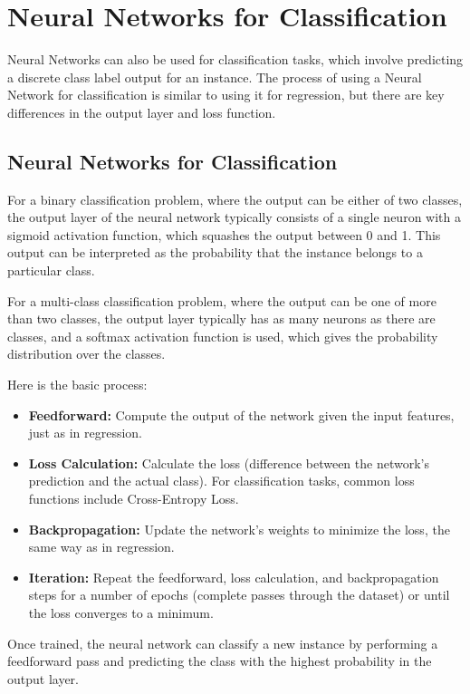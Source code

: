 \chapter{Neural Networks for Classification}

Neural Networks can also be used for classification tasks, which
involve predicting a discrete class label output for an instance. The
process of using a Neural Network for classification is similar to
using it for regression, but there are key differences in the output
layer and loss function.

\section{Neural Networks for Classification}

For a binary classification problem, where the output can be either of
two classes, the output layer of the neural network typically consists
of a single neuron with a sigmoid activation function, which squashes
the output between 0 and 1. This output can be interpreted as the
probability that the instance belongs to a particular class.

For a multi-class classification problem, where the output can be one
of more than two classes, the output layer typically has as many
neurons as there are classes, and a softmax activation function is
used, which gives the probability distribution over the classes.

Here is the basic process:

\begin{itemize}

\item \textbf{Feedforward:} Compute the output of the network given
  the input features, just as in regression.

\item \textbf{Loss Calculation:} Calculate the loss (difference
  between the network's prediction and the actual class). For
  classification tasks, common loss functions include Cross-Entropy
  Loss.

\item \textbf{Backpropagation:} Update the network's weights to
  minimize the loss, the same way as in regression.

\item \textbf{Iteration:} Repeat the feedforward, loss calculation,
  and backpropagation steps for a number of epochs (complete passes
  through the dataset) or until the loss converges to a minimum.

\end{itemize}

Once trained, the neural network can classify a new instance by
performing a feedforward pass and predicting the class with the
highest probability in the output layer.
